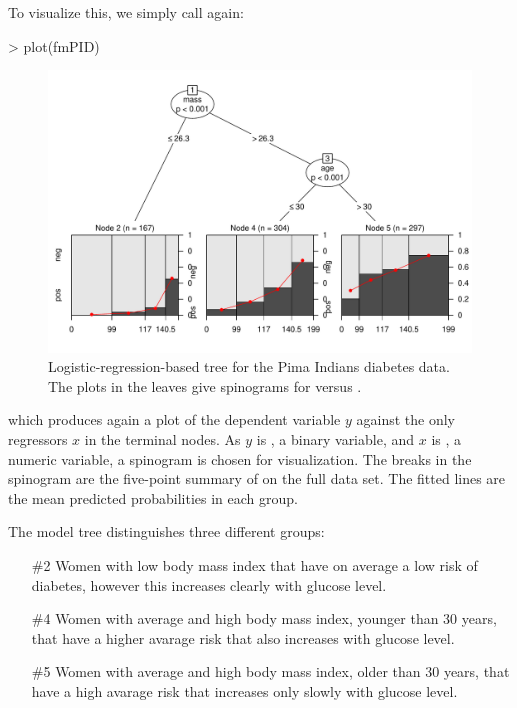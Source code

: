 \documentclass{Z}
\begin{document}
To visualize this, we simply call again:

\begin{Schunk}
\begin{Sinput}
> plot(fmPID)
\end{Sinput}
\end{Schunk}

\begin{figure}[bth]
\begin{center}
\includegraphics{MOB-PimaIndiansDiabetes-plot}
\caption{\label{fig:PimaIndiansDiabetes} Logistic-regression-based tree for the Pima Indians
diabetes data. The plots in the leaves give spinograms for  versus 
.}
\end{center}
\end{figure}

which produces again a plot of the dependent variable $y$ against the only regressors
$x$ in the terminal nodes. As $y$ is , a binary variable, and $x$ is 
, a numeric variable, a spinogram is chosen for visualization. The breaks
in the spinogram are the five-point summary of  on the full data set. The
fitted lines are the mean predicted probabilities in each group.

The model tree distinguishes three different groups:
\begin{itemize}
  \item[\#2] Women with low body mass index that have on average a low risk of
    diabetes, however this increases clearly with glucose level.
  \item[\#4] Women with average and high body mass index, younger than 30 years,
    that have a higher avarage risk that also increases with glucose level.
  \item[\#5] Women with average and high body mass index, older than 30 years,
    that have a high avarage risk that increases only slowly with glucose level.
\end{itemize}
\end{document}
